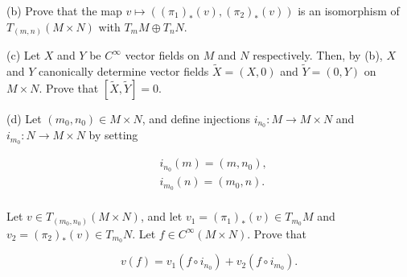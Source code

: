 \begin{problemset}
	(b) Prove that the map $v \mapsto ((\pi_{1})_{*}(v), (\pi_{2})_{*}(v))$ is an isomorphism of $T_{(m,n)}(M \times N)$ with $T_{m} M \oplus T_{n} N$.

	(c) Let $X$ and $Y$ be $C^{\infty}$ vector fields on $M$ and $N$ respectively. Then, by (b), $X$ and $Y$ canonically determine vector fields $\tilde{X} = (X,0)$ and $\tilde{Y} = (0,Y)$ on $M \times N$. Prove that $[\tilde{X}, \tilde{Y}] = 0$.

	(d) Let  $ (m_{0}, n_{0}) \in M \times N $, and define injections  $ i_{n_{0}}: M \to M \times N $ and  $ i_{m_{0}}: N \to M \times N $ by setting

	\[
		\begin{aligned}{}&{{}i_{n_{0}}(m)=(m,n_{0}),}\\ {}&{{}i_{m_{0}}(n)=(m_{0},n).}\\ \end{aligned}
	\]

	Let  $ v \in T_{(m_0,n_0)}(M \times N) $, and let  $ v_1 = (\pi_{1})_{*}(v) \in T_{m_0} M $ and  $ v_2 = (\pi_{2})_{*}(v) \in T_{m_0} N $. Let  $ f \in C^\infty(M \times N) $. Prove that

	\[
		v(f)=v_{1}(f\circ i_{n_{0}})+v_{2}(f\circ i_{m_{0}}).
	\]

\end{problemset}
